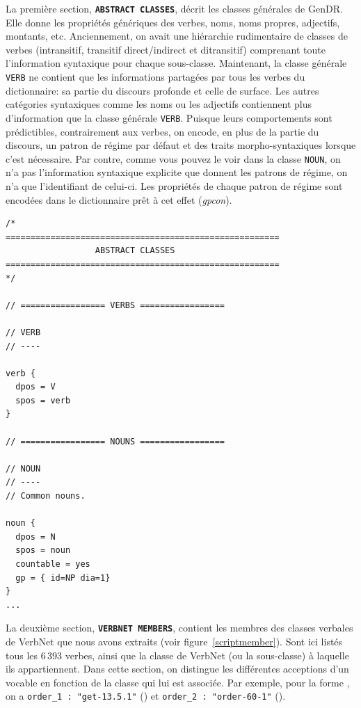 La première section, \textbf{\texttt{ABSTRACT CLASSES}}, décrit les classes générales de GenDR. Elle donne les propriétés génériques des verbes, noms, noms propres, adjectifs, montants, etc. Anciennement, on avait une hiérarchie rudimentaire de classes de verbes (intransitif, transitif direct/indirect et ditransitif) comprenant toute l'information syntaxique pour chaque sous-classe. Maintenant, la classe générale \texttt{VERB} ne contient que les informations partagées par tous les verbes du dictionnaire: sa partie du discours profonde et celle de surface. Les autres catégories syntaxiques comme les noms ou les adjectifs contiennent plus d'information que la classe générale \texttt{VERB}. Puisque leurs comportements sont prédictibles, contrairement aux verbes, on encode, en plus de la partie du discours, un patron de régime par défaut et des traits morpho-syntaxiques lorsque c'est nécessaire. Par contre, comme vous pouvez le voir dans la classe \texttt{NOUN}, on n'a pas l'information syntaxique explicite que donnent les patrons de régime, on n'a que l'identifiant de celui-ci. Les propriétés de chaque patron de régime sont encodées dans le dictionnaire prêt à cet effet (\emph{gpcon}).

\begin{lstlisting}[language=mate, caption = Extrait du \emph{lexicon}: attributs par défaut des classes génériques, label=classedef]
/*
=======================================================
                  ABSTRACT CLASSES
=======================================================
*/

// ================= VERBS =================

// VERB
// ----

verb {
  dpos = V
  spos = verb
}

// ================= NOUNS =================

// NOUN
// ----
// Common nouns.

noun {
  dpos = N
  spos = noun
  countable = yes
  gp = { id=NP dia=1}
}
...
\end{lstlisting}

La deuxième section, \textbf{\texttt{VERBNET MEMBERS}}, contient les membres des classes verbales de VerbNet que nous avons extraits (voir figure~\ref{scriptmember}). Sont ici listés tous les 6\,393 verbes, ainsi que la classe de VerbNet (ou la sous-classe) à laquelle ils appartiennent. Dans cette section, on distingue les différentes acceptions d'un vocable en fonction de la classe qui lui est associée. Par exemple, pour la forme , on a \texttt{order\_1 : "get-13.5.1"} () et \texttt{order\_2 : "order-60-1"} ().

